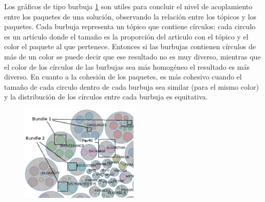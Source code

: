 Los gráficos de tipo burbuja \ref{res:img-explain-bubbles} son utiles para concluir el nivel de acoplamiento entre los paquetes de una solución, observando la relación entre los tópicos y los paquetes. Cada burbuja representa un tópico que contiene círculos; cada circulo es un artículo donde el tamaño es la proporción del articulo con el tópico y el color el paquete al que pertenece. Entonces si las burbujas contienen círculos de más de un color se puede decir que ese resultado no es muy diverso, mientras que el color de los círculos de las burbujas sea más homogéneo el resultado es más diverso. En cuanto a la cohesión de los paquetes, es más cohesivo cuando el tamaño de cada circulo dentro de cada burbuja sea similar (para el mismo color) y la distribución de los círculos entre cada burbuja es equitativa.

\begin{figure}[H]
  \centering
    \includegraphics[width=0.5\textwidth]{img/explain-bubbles.png}
  \caption{}
  \label{res:img-explain-bubbles}
\end{figure}

